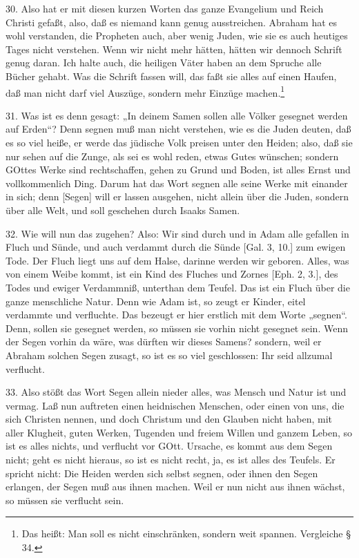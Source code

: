 30. Also hat er mit diesen kurzen Worten das ganze Evangelium und Reich Christi gefaßt, also, daß es niemand kann genug ausstreichen. Abraham hat es wohl verstanden, die Propheten auch, aber wenig Juden, wie sie es auch heutiges Tages nicht verstehen. Wenn wir nicht mehr hätten, hätten wir dennoch Schrift genug daran. Ich halte auch, die heiligen Väter haben an dem Spruche alle Bücher gehabt. Was die Schrift fassen will, das faßt sie alles auf einen Haufen,
daß man nicht darf viel Auszüge, sondern mehr Einzüge machen.\footnote{Das heißt: Man soll es nicht einschränken, sondern weit spannen. Vergleiche § 34.}

31. Was ist es denn gesagt: „In deinem Samen sollen alle Völker gesegnet werden auf Erden“? Denn segnen muß man nicht verstehen, wie es die Juden deuten, daß es so viel heiße, er werde das jüdische Volk preisen unter den Heiden; also, daß sie nur sehen auf die Zunge, als sei es wohl reden, etwas Gutes wünschen; sondern GOttes Werke sind rechtschaffen, gehen zu Grund und Boden, ist alles Ernst und vollkommenlich Ding. Darum hat das Wort segnen alle seine Werke mit einander in sich; denn [Segen] will er lassen ausgehen, nicht allein über die Juden, sondern über alle Welt, und soll geschehen durch Isaaks Samen.

32. Wie will nun das zugehen? Also: Wir sind durch und in Adam alle gefallen in Fluch und Sünde, und auch verdammt durch die Sünde [Gal. 3, 10.] zum ewigen Tode. Der Fluch liegt uns auf dem Halse, darinne werden wir geboren. Alles, was von einem Weibe kommt, ist ein Kind des Fluches und Zornes [Eph. 2, 3.], des Todes und ewiger Verdammniß, unterthan dem Teufel. Das ist ein Fluch über die ganze menschliche Natur. Denn wie Adam ist, so zeugt er Kinder, eitel verdammte und verfluchte. Das bezeugt er hier erstlich mit dem Worte „segnen“. Denn, sollen sie gesegnet werden, so müssen sie vorhin nicht gesegnet sein. Wenn der Segen vorhin da wäre, was dürften wir dieses Samens? sondern, weil er Abraham solchen Segen zusagt, so ist es so viel geschlossen: Ihr seid allzumal verflucht.

33. Also stößt das Wort Segen allein nieder alles, was Mensch und Natur ist und vermag. Laß nun auftreten einen heidnischen Menschen, oder einen von uns, die sich Christen nennen, und doch Christum und den Glauben nicht haben, mit aller Klugheit, guten Werken, Tugenden und freiem Willen und ganzem Leben, so ist es alles nichts, und verflucht vor GOtt. Ursache, es kommt aus dem Segen nicht; geht es nicht hieraus, so ist es nicht recht, ja, es ist alles des Teufels. Er spricht nicht: Die Heiden werden sich selbst segnen, oder ihnen den Segen erlangen, der Segen muß aus ihnen machen. Weil er nun nicht aus ihnen wächst, so müssen sie verflucht sein.

